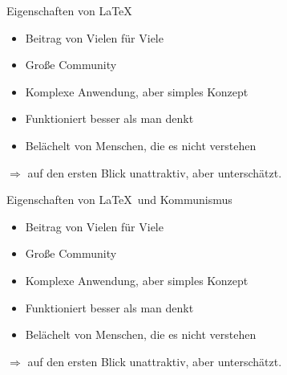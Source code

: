 \documentclass{beamer}
\begin{document}
\begin{frame}{Eigenschaften von \LaTeX}
    \begin{itemize}
        \item<2-> Beitrag von Vielen für Viele
        \item<3-> Große Community
        \item<4-> Komplexe Anwendung, aber simples Konzept
        \item<5-> Funktioniert besser als man denkt
        \item<6-> Belächelt von Menschen, die es nicht verstehen
    \end{itemize}

        $\Rightarrow$ auf den ersten Blick unattraktiv, aber unterschätzt.
\end{frame}

\begin{frame}{Eigenschaften von \LaTeX\ und Kommunismus}
    \begin{itemize}
        \item Beitrag von Vielen für Viele
        \item Große Community
        \item Komplexe Anwendung, aber simples Konzept
        \item Funktioniert besser als man denkt
        \item Belächelt von Menschen, die es nicht verstehen
    \end{itemize}
        $\Rightarrow$ auf den ersten Blick unattraktiv, aber unterschätzt.
\end{frame}
\end{document}
